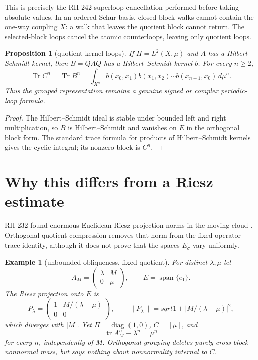 \documentclass[11pt]{article}
\newtheorem{proposition}[theorem]{Proposition}
\newtheorem{example}[theorem]{Example}
\newcommand{\Tr}{\operatorname{Tr}}
\begin{document}
This is precisely the RH-242 superloop cancellation \citep{WangRH242}
performed before taking absolute values.  In an ordered Schur basis, closed
block walks cannot contain the one-way coupling $X$: a walk that leaves the
quotient block cannot return.  The selected-block loops cancel the atomic
counterloops, leaving only quotient loops.

\begin{proposition}[quotient-kernel loops]\label{prop:kernel}
If $H=L^2(X,\mu)$ and $A$ has a Hilbert--Schmidt kernel, then $B=QAQ$ has a
Hilbert--Schmidt kernel $b$.  For every $n\ge2$,
\[
 \Tr C^n=\Tr B^n
 =\int_{X^n}b(x_0,x_1)b(x_1,x_2)\cdots
 b(x_{n-1},x_0)\,d\mu^n.
\]
Thus the grouped representation remains a genuine signed or complex
periodic-loop formula.
\end{proposition}

\begin{proof}
The Hilbert--Schmidt ideal is stable under bounded left and right
multiplication, so $B$ is Hilbert--Schmidt and vanishes on $E$ in the
orthogonal block form.  The standard trace formula for products of
Hilbert--Schmidt kernels gives the cyclic integral; its nonzero block is
$C^n$.
\end{proof}

\section{Why this differs from a Riesz estimate}

RH-232 found enormous Euclidean Riesz projection norms in the moving cloud
\citep{WangRH232}.  Orthogonal quotient compression removes that norm from
the fixed-operator trace identity, although it does not prove that the spaces
$E_\sigma$ vary uniformly.

\begin{example}[unbounded obliqueness, fixed quotient]\label{ex:model}
For distinct $\lambda,\mu$ let
\[
 A_M=\begin{pmatrix}\lambda&M\\0&\mu\end{pmatrix},
 \qquad E=\operatorname{span}\{e_1\}.
\]
The Riesz projection onto $E$ is
\[
 P_\lambda=\begin{pmatrix}1&M/(\lambda-\mu)\\0&0\end{pmatrix},
 \qquad
 \|P_\lambda\|=sqrt{1+|M/(\lambda-\mu)|^2},
\]
which diverges with $|M|$.  Yet $\Pi=\operatorname{diag}(1,0)$,
$C=[\mu]$, and
\[
 \operatorname{tr}A_M^n-\lambda^n=\mu^n
\]
for every $n$, independently of $M$.  Orthogonal grouping deletes purely
cross-block nonnormal mass, but says nothing about nonnormality internal to
$C$.
\end{example}
\end{document}
